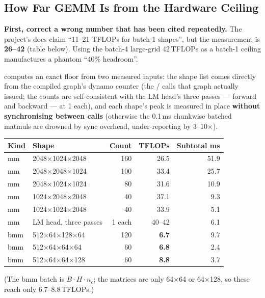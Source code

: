 \subsection{How Far GEMM Is from the Hardware Ceiling}
\label{sec:en-eng-gemm}

\textbf{First, correct a wrong number that has been cited repeatedly.} The project's docs
claim ``11--21 TFLOPs for batch-1 shapes'', but the measurement is \textbf{26--42} (table
below). Using the batch-4 large-grid 42\,TFLOPs as a batch-1 ceiling manufactures a phantom
``40\% headroom''.

 computes an exact floor from two measured inputs: the shape
list comes directly from the compiled graph's dynamo counter \textbf{}
(the  /  calls that graph actually issued; the counts are
self-consistent with the LM head's three passes --- forward and backward --- at 1 each), and
each shape's peak is measured in place \textbf{without synchronising between calls} (otherwise
the 0.1\,ms chunkwise batched matmuls are drowned by sync overhead, under-reporting by
3--10$\times$).

\begin{center}\small
\begin{tabular}{@{}llrrr@{}}
\toprule
\textbf{Kind} & \textbf{Shape} & \textbf{Count} & \textbf{TFLOPs} & \textbf{Subtotal ms} \\
\midrule
mm & 2048$\times$1024$\times$2048 & 160 & 26.5 & 51.9 \\
mm & 2048$\times$2048$\times$1024 & 100 & 33.4 & 25.7 \\
mm & 2048$\times$1024$\times$1024 & 80 & 31.6 & 10.9 \\
mm & 1024$\times$2048$\times$2048 & 40 & 37.1 & 9.3 \\
mm & 1024$\times$1024$\times$2048 & 40 & 33.9 & 5.1 \\
mm & LM head, three passes & 1 each & 40--42 & 6.1 \\
bmm & 512$\times$64$\times$128$\times$64 & 120 & \textbf{6.7} & 9.7 \\
bmm & 512$\times$64$\times$64$\times$64 & 60 & \textbf{6.8} & 2.4 \\
bmm & 512$\times$64$\times$64$\times$128 & 60 & \textbf{8.8} & 3.7 \\
\bottomrule
\end{tabular}
\end{center}

(The bmm batch is $B{\cdot}H{\cdot}n_c$; the matrices are only 64$\times$64 or 64$\times$128, so
these reach only 6.7--8.8\,TFLOPs.)

